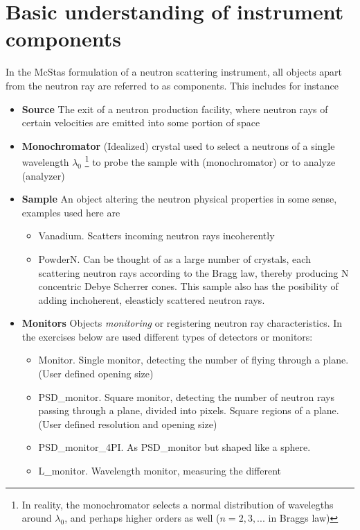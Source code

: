 \section{Basic understanding of instrument components}
In the McStas formulation of a neutron scattering instrument, all
objects apart from the neutron ray are referred to as components. This
includes for instance
\begin{itemize}
\item{{\bf Source} The exit of a neutron production facility, where
    neutron rays of certain velocities are emitted into some
    portion of space}
\item{{\bf Monochromator} (Idealized) crystal used to select a
    neutrons of a single wavelength $\lambda_0$ \footnote{In reality,
    the monochromator selects a normal distribution of wavelegths
    around $\lambda_0$, and perhaps higher orders as well ($n=2,3,...$
    in Braggs law)} to probe the sample with (monochromator) or to 
    analyze (analyzer)}
\item{{\bf Sample} An object altering the neutron physical properties
    in some sense, examples used here are}
  \begin{itemize}
    \item{Vanadium. Scatters incoming neutron rays incoherently}
    \item{PowderN. Can be thought of as a large number of crystals,
        each scattering neutron rays according to the Bragg law, thereby
        producing N concentric Debye Scherrer cones. This sample also
        has the posibility of adding inchoherent, eleasticly scattered
        neutron rays.}
    \end{itemize}
\item{{\bf Monitors} Objects \emph{monitoring} or registering neutron ray
    characteristics. In the exercises below are used different types
    of detectors or monitors:}
  \begin{itemize}
    \item{Monitor. Single monitor, detecting the number of flying
        through a plane. (User defined opening size)}
    \item{PSD\_monitor. Square monitor, detecting the number of
        neutron rays passing through a plane, divided into
        pixels. Square regions of a plane. (User defined resolution 
        and opening size)}
    \item{PSD\_monitor\_4PI. As PSD\_monitor but shaped like a sphere.}
    \item{L\_monitor. Wavelength monitor, measuring the different
}
\end{itemize}
\end{itemize}
